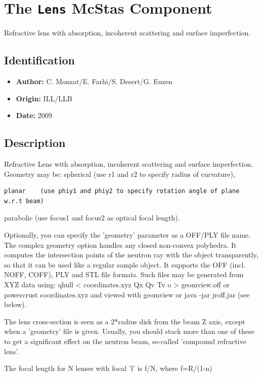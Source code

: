 \section{The \texttt{Lens} McStas Component}
Refractive lens with absorption, incoherent scattering and surface imperfection.

\subsection*{Identification}
\begin{itemize}
  \item \textbf{Author:} C. Monzat/E. Farhi/S. Desert/G. Euzen
  \item \textbf{Origin:} ILL/LLB
  \item \textbf{Date:} 2009
\end{itemize}

\subsection*{Description}
Refractive Lens with absorption, incoherent scattering and surface imperfection. Geometry may be: spherical (use r1 and r2 to specify radius of curvature),

\begin{verbatim}
planar    (use phiy1 and phiy2 to specify rotation angle of plane w.r.t beam)
\end{verbatim}

parabolic (use focus1 and focus2 as optical focal length).

Optionally, you can specify the 'geometry' parameter as a OFF/PLY file name. The complex geometry option handles any closed non-convex polyhedra. It computes the intersection points of the neutron ray with the object transparently, so that it can be used like a regular sample object. It supports the OFF (incl. NOFF, COFF), PLY and STL file formats. Such files may be generated from XYZ data using: qhull \textless{} coordinates.xyz Qx Qv Tv o \textgreater{} geomview.off or powercrust coordinates.xyz and viewed with geomview or java -jar jroff.jar (see below).

The lens cross-section is seen as a 2*radius disk from the beam Z axis, except when a 'geometry' file is given. Usually, you should stack more than one of these to get a significant effect on the neutron beam, so-called 'compound refractive lens'.

The focal length for N lenses with focal 'f' is f/N, where f=R/(1-n)

